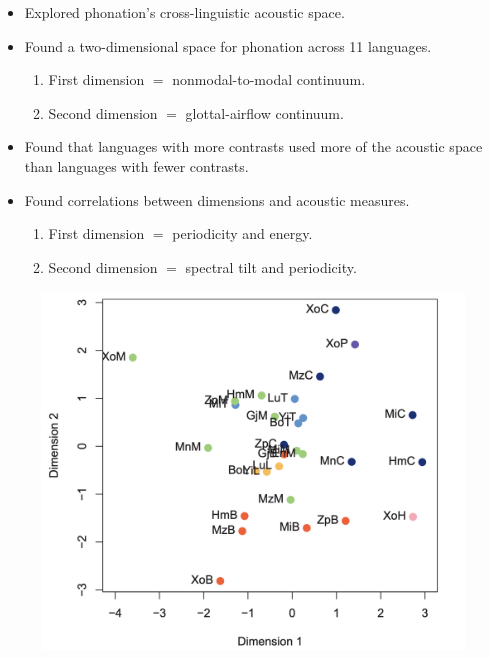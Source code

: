 \documentclass{beamer}
\begin{document}
\begin{frame}{\citet{keatingCrosslanguageAcousticSpace2023}}
  \begin{itemize}
    \item Explored phonation's cross-linguistic acoustic space.
    \item Found a two-dimensional space for phonation across 11 languages.
    \begin{enumerate}
      \item First dimension $=$ nonmodal-to-modal continuum.
      \item Second dimension $=$ glottal-airflow continuum.
    \end{enumerate}
    \item Found that languages with more contrasts used more of the acoustic space than languages with fewer contrasts.
    \item Found correlations between dimensions and acoustic measures.
    \begin{enumerate}
      \item First dimension $=$ periodicity and energy.
      \item Second dimension $=$ spectral tilt and periodicity.
    \end{enumerate}
  \end{itemize}
\end{frame}

\begin{frame}{\citet{keatingCrosslanguageAcousticSpace2023}}
  \begin{figure}[h!]
    \centering
    \includegraphics[width = 0.8\linewidth]{images/Keating_dimension.png}
  \end{figure}
\end{frame}
\end{document}
